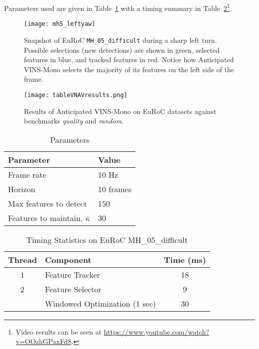 Parameters used are given in Table~\ref{tab:parameters} with a timing summary in Table~\ref{tab:timing}\footnote{Video results can be seen at \url{https://www.youtube.com/watch?v=OOzhGPaxFd8}.}.

\begin{figure}
\centering
\texttt{[image: mh5\_leftyaw]} 
\caption{Snapshot of EuRoC \texttt{MH\_05\_difficult} during a sharp left turn. Possible selections (new detections) are shown in green, selected features in blue, and tracked features in red. Notice how Anticipated VINS-Mono selects the majority of its features on the left side of the frame.}
\label{fig:architecture} 
\end{figure}

\begin{figure}
	\centering
	\texttt{[image: tableVNAVresults.png]} 
	\caption{Results of Anticipated VINS-Mono on EuRoC datasets against benchmarks \textit{quality} and \textit{random}.}
	\label{tab:results} 
\end{figure}

\begin{table}[h]
\centering
\caption{Parameters}
\begin{tabular}{ll}
    \toprule
    Parameter & Value \\
    \midrule
    Frame rate & 10 Hz \\
    Horizon & 10 frames \\
    Max features to detect & 150 \\
    Features to maintain, $\bar{\kappa}$ & 30 \\
    \bottomrule
\end{tabular}
\label{tab:parameters}
\end{table}

\begin{table}[h]
\centering
\caption{Timing Statistics on EuRoC MH\_05\_difficult}
\begin{tabular}{clc}
    \toprule
    Thread & Component & Time (ms) \\
    \midrule
    1 & Feature Tracker & 18 \\
    \midrule
    2 & Feature Selector & 9 \\
      & Windowed Optimization (1 sec) & 30 \\
    \bottomrule
\end{tabular}
\label{tab:timing}
\end{table}